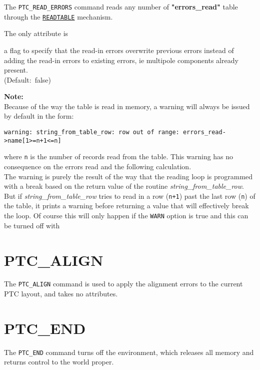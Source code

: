The \texttt{PTC\_READ\_ERRORS} command reads any number of
\textbf{"errors\_read"} table through the 
\hyperref[sec:readtable]{\texttt{READTABLE}} mechanism.


The only attribute is 
\begin{madlist}
    a flag to specify that the read-in errors
   overwrite previous errors instead of adding the read-in errors to
   existing errors, ie multipole components already present.\\
   (Default:~false)  
\end{madlist}

\textbf{Note:}\\
Because of the way the table is read in memory, a warning will always be
issued by default in the form:
{\small
\begin{verbatim}
warning: string_from_table_row: row out of range: errors_read->name[1>=n+1<=n]
\end{verbatim}
}
where \texttt{n} is  the number of records read from the table. 
This warning has no consequence on the errors read and the following
calculation. \\
The warning is purely the result of the way that the reading loop is
programmed with a break based on the return value of the routine
\textsl{string\_from\_table\_row}.  
But if \textsl{string\_from\_table\_row} tries to read in a row (\texttt{n+1})
past the last row (\texttt{n}) of the table, it prints a warning before
returning a value that will effectively break the loop. Of course this
will only happen if the \texttt{WARN} option is true and this can be turned
off with 

       

\section{PTC\_ALIGN}
\label{sec:ptc-align}

The \texttt{PTC\_ALIGN} command is used to apply the \madx alignment
errors to the current PTC layout, and takes no attributes.



\section{PTC\_END}
\label{sec:ptc-end}

The \texttt{PTC\_END} command turns off the \ptc environment,
which releases all memory and returns control to the \madx world proper.

